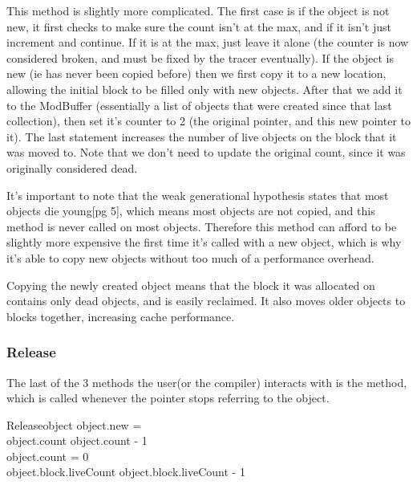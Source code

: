 \documentclass{article}
\begin{document}
This method is slightly more complicated. The first case is if the object is not new, it first checks to make sure the count isn't at the max, and if it isn't just increment and continue. If it is at the max, just leave it alone (the counter is now considered broken, and must be fixed by the tracer eventually). If the object is new (ie has never been copied before) then we first copy it to a new location, allowing the initial block to be filled only with new objects. After that we add it to the ModBuffer (essentially a list of objects that were created since that last collection), then set it's counter to 2 (the original pointer, and this new pointer to it). The last statement increases the number of live objects on the block that it was moved to. Note that we don't need to update the original count, since it was originally considered dead.

It's important to note that the weak generational hypothesis states that most objects die young\cite{rcimmix}[pg 5], which means most objects are not copied, and this method is never called on most objects. Therefore this method can afford to be slightly more expensive the first time it's called with a new object, which is why it's able to copy new objects without too much of a performance overhead. 

Copying the newly created object means that the block it was allocated on contains only dead objects, and is easily reclaimed. It also moves older objects to blocks together, increasing cache performance.

\subsubsection{Release}

The last of the 3 methods the user(or the compiler) interacts with is the  method, which is called whenever the pointer stops referring to the object.

\begin{pseudocode}{Release}{object}
	\IF object.new = \TRUE \THEN
		\RETURN{}\\
	object.count \GETS object.count - 1\\
	\IF object.count = 0 \THEN
	\BEGIN
		\\
		object.block.liveCount \GETS object.block.liveCount - 1\\
		\\
	\END
\end{pseudocode}
\end{document}
